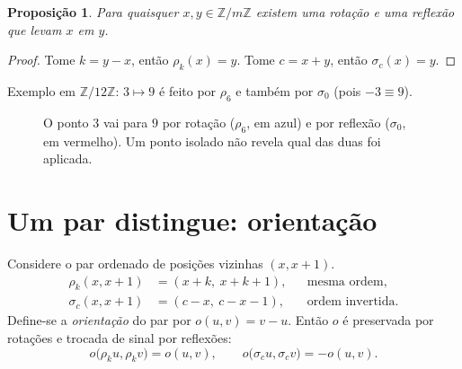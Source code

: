 \documentclass[12pt,a4paper]{article}
\newtheorem{proposicao}{Proposição}
\theoremstyle{definition}
\newcommand{\Z}{\mathbb{Z}}
\newcommand{\Zm}{\mathbb{Z}/m\mathbb{Z}}
\newcommand{\face}{%
  \draw (0,0) circle (2);
  \foreach \i in {0,...,11} {
    \fill ({90-30*\i}:2) circle (1.5pt);
    \node at ({90-30*\i}:2.4) {\small\i};
  }
}
\begin{document}
\begin{proposicao}
Para quaisquer $x,y\in\Zm$ existem uma rotação e uma reflexão que levam $x$ em $y$.
\end{proposicao}

\begin{proof}
Tome $k=y-x$, então $\rho_k(x)=y$. Tome $c=x+y$, então $\sigma_c(x)=y$.
\end{proof}

Exemplo em $\Z/12\Z$: $3\mapsto 9$ é feito por $\rho_6$ e também por $\sigma_0$ (pois $-3\equiv 9$).

\begin{figure}[htbp]
\centering
{}
\caption{O ponto $3$ vai para $9$ por rotação ($\rho_6$, em azul) e por reflexão ($\sigma_0$, em vermelho). Um ponto isolado não revela qual das duas foi aplicada.}
\end{figure}

\section{Um par distingue: orientação}

Considere o par ordenado de posições vizinhas $(x,x+1)$.
\begin{align*}
\rho_k(x,x+1)&=(x+k,\ x+k+1), && \text{mesma ordem},\\
\sigma_c(x,x+1)&=(c-x,\ c-x-1), && \text{ordem invertida}.
\end{align*}
Define-se a \emph{orientação} do par por $o(u,v)=v-u$. Então $o$ é preservada por rotações e trocada de sinal por reflexões:
\[
o\bigl(\rho_k u,\rho_k v\bigr)=o(u,v),\qquad o\bigl(\sigma_c u,\sigma_c v\bigr)=-o(u,v).
\]
\end{document}
